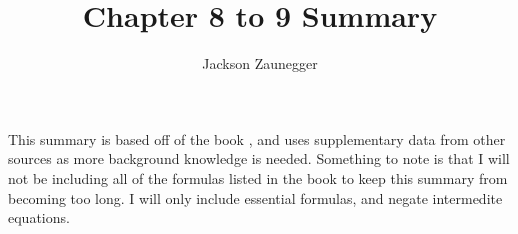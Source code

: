 \documentclass[12pt]{article}
\begin{document}
\title{Chapter 8 to 9 Summary}
\author{Jackson Zaunegger}
\date{}
\maketitle

\pagebreak
This summary is based off of the book \cite{BRA}, and uses supplementary data from other sources as more background knowledge is needed. Something to note is that I will not be including all of the formulas listed in the book to keep this summary from becoming too long. I will only include essential formulas, and negate intermedite equations. 
\tableofcontents

\pagebreak
\end{document}
